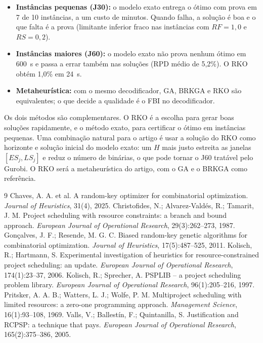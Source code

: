 \documentclass[11pt,a4paper]{article}
\begin{document}
\begin{itemize}
  \item \textbf{Instâncias pequenas (J30):} o modelo exato entrega o ótimo com prova em 7 de 10
        instâncias, a um custo de minutos. Quando falha, a solução é boa e o que falta é a prova
        (limitante inferior fraco nas instâncias com $RF = 1{,}0$ e $RS = 0{,}2$).
  \item \textbf{Instâncias maiores (J60):} o modelo exato não prova nenhum ótimo em 600~s e passa a
        errar também nas soluções (RPD médio de 5,2\%). O RKO obtém 1,0\% em 24~s.
  \item \textbf{Metaheurística:} com o mesmo decodificador, GA, BRKGA e RKO são equivalentes; o que
        decide a qualidade é o FBI no decodificador.
\end{itemize}
Os dois métodos são complementares. O RKO é a escolha para gerar boas soluções rapidamente, e o
método exato, para certificar o ótimo em instâncias pequenas. Uma combinação natural para o
artigo é usar a solução do RKO como horizonte e solução inicial do modelo exato: um $H$ mais
justo estreita as janelas $[ES_j, LS_j]$ e reduz o número de binárias, o que pode tornar o J60
tratável pelo Gurobi. O RKO será a metaheurística do artigo, com o GA e o BRKGA como referência.

\vspace{-0.4em}
{\footnotesize
\renewcommand{\refname}{\normalsize Referências}
\begin{thebibliography}{9}\setlength{\itemsep}{0pt}
 Chaves, A. A. et al. A random-key optimizer for combinatorial optimization. \emph{Journal of Heuristics}, 31(4), 2025.
 Christofides, N.; Alvarez-Valdés, R.; Tamarit, J. M. Project scheduling with resource constraints: a branch and bound approach. \emph{European Journal of Operational Research}, 29(3):262--273, 1987.
 Gonçalves, J. F.; Resende, M. G. C. Biased random-key genetic algorithms for combinatorial optimization. \emph{Journal of Heuristics}, 17(5):487--525, 2011.
 Kolisch, R.; Hartmann, S. Experimental investigation of heuristics for resource-constrained project scheduling: an update. \emph{European Journal of Operational Research}, 174(1):23--37, 2006.
 Kolisch, R.; Sprecher, A. PSPLIB -- a project scheduling problem library. \emph{European Journal of Operational Research}, 96(1):205--216, 1997.
 Pritsker, A. A. B.; Watters, L. J.; Wolfe, P. M. Multiproject scheduling with limited resources: a zero-one programming approach. \emph{Management Science}, 16(1):93--108, 1969.
 Valls, V.; Ballestín, F.; Quintanilla, S. Justification and RCPSP: a technique that pays. \emph{European Journal of Operational Research}, 165(2):375--386, 2005.
\end{thebibliography}}
\end{document}
